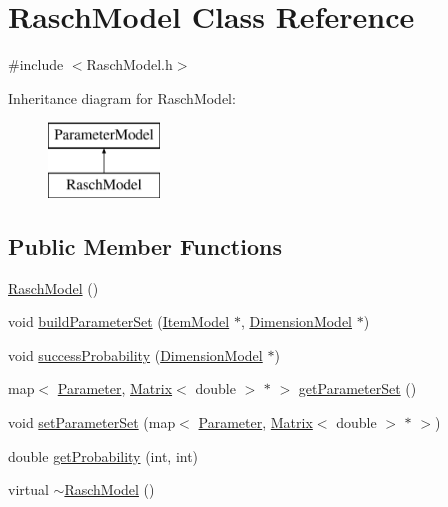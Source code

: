 \hypertarget{classRaschModel}{}\section{Rasch\+Model Class Reference}
\label{classRaschModel}


{\ttfamily \#include $<$Rasch\+Model.\+h$>$}

Inheritance diagram for Rasch\+Model\+:\begin{figure}[H]
\begin{center}
\leavevmode
\includegraphics[height=2.000000cm]{classRaschModel}
\end{center}
\end{figure}
\subsection*{Public Member Functions}
\begin{DoxyCompactItemize}
\item 
\hyperlink{classRaschModel_ab4efbe6df1d5dad527d4ff7ac7637033}{Rasch\+Model} ()
\item 
void \hyperlink{classRaschModel_a73b865f129db10fb7ba74495c3fce60b}{build\+Parameter\+Set} (\hyperlink{classItemModel}{Item\+Model} $\ast$, \hyperlink{classDimensionModel}{Dimension\+Model} $\ast$)
\item 
void \hyperlink{classRaschModel_a3d082fd28aa10277623dd665d2127d64}{success\+Probability} (\hyperlink{classDimensionModel}{Dimension\+Model} $\ast$)
\item 
map$<$ \hyperlink{ParameterModel_8h_a04ed5b8f1f3adf7af1d5092fae847e90}{Parameter}, \hyperlink{singletonMatrix}{Matrix}$<$ double $>$ $\ast$ $>$ \hyperlink{classRaschModel_aee54609e4db0cb065dc1761e787e8ba9}{get\+Parameter\+Set} ()
\item 
void \hyperlink{classRaschModel_a3c4614d2536c807cea40df2301c063ca}{set\+Parameter\+Set} (map$<$ \hyperlink{ParameterModel_8h_a04ed5b8f1f3adf7af1d5092fae847e90}{Parameter}, \hyperlink{singletonMatrix}{Matrix}$<$ double $>$ $\ast$ $>$)
\item 
double \hyperlink{classRaschModel_ae9a8edbdf6d1e5b801fb291b7035fc79}{get\+Probability} (int, int)
\item 
virtual \hyperlink{classRaschModel_aad14886beb9250bf60ecb44009fee0b2}{$\sim$\+Rasch\+Model} ()
\end{DoxyCompactItemize}
